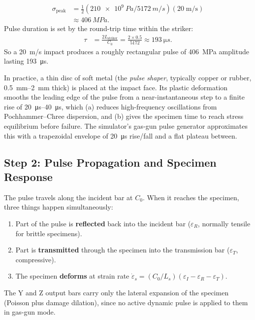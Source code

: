 \documentclass[11pt,a4paper]{article}
\providecommand{\SI}[2]{\qty{#1}{#2}}
\providecommand{\SIrange}[3]{\qtyrange{#1}{#2}{#3}}
\newcommand{\sig}{\sigma}
\newcommand{\eps}{\varepsilon}
\newcommand{\epsdot}{\dot\eps}
\newcommand{\Cz}{C_0}
\newcommand{\Ls}{L_s}
\newcommand{\sigpeak}{\sig_{\text{peak}}}
\begin{document}
\begin{stepbox}[Worked numbers: striker velocity $V = \SI{20}{m/s}$]
  \begin{align*}
  \sigpeak &= \tfrac{1}{2}(\SI{210e9}{Pa} / \SI{5172}{m/s})(20\;\mathrm{m/s})
           \\
           &\approx \SI{406}{MPa}.
  \end{align*}
  Pulse duration is set by the round-trip time within the striker:
  \begin{align*}
  \tau &= \frac{2 L_{\text{striker}}}{\Cz} = \frac{2 \times 0.5}{5172}
       \approx \SI{193}{\micro s}.
  \end{align*}
  So a \SI{20}{m/s} impact produces a roughly rectangular pulse of \SI{406}{MPa}
  amplitude lasting \SI{193}{\micro s}.
\end{stepbox}

In practice, a thin disc of soft metal (the \emph{pulse shaper}, typically copper
or rubber, \SIrange{0.5}{2}{mm} thick) is placed at the impact face. Its plastic
deformation smooths the leading edge of the pulse from a near-instantaneous step
to a finite rise of \SIrange{20}{40}{\micro s}, which (a) reduces high-frequency
oscillations from Pochhammer--Chree dispersion, and (b) gives the specimen time
to reach stress equilibrium before failure. The simulator's gas-gun pulse
generator approximates this with a trapezoidal envelope of \SI{20}{\micro s}
rise/fall and a flat plateau between.

\subsection{Step 2: Pulse Propagation and Specimen Response}

The pulse travels along the incident bar at $\Cz$. When it reaches the specimen,
three things happen simultaneously:
\begin{enumerate}[leftmargin=*]
  \item Part of the pulse is \textbf{reflected} back into the incident bar
        ($\eps_R$, normally tensile for brittle specimens).
  \item Part is \textbf{transmitted} through the specimen into the
        transmission bar ($\eps_T$, compressive).
  \item The specimen \textbf{deforms} at strain rate
        $\epsdot_s = (\Cz/\Ls)(\eps_I - \eps_R - \eps_T)$.
\end{enumerate}
The Y and Z output bars carry only the lateral expansion of the specimen
(Poisson plus damage dilation), since no active dynamic pulse is applied to them
in gas-gun mode.
\end{document}
